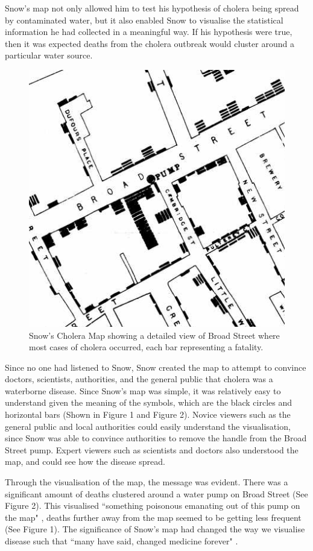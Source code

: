 \documentclass[12pt]{article}
\begin{document}
Snow's map not only allowed him to test his hypothesis of cholera being spread by contaminated water, but it also enabled Snow to visualise the statistical information he had collected in a meaningful way. If his hypothesis were true, then it was expected deaths from the cholera outbreak would cluster around a particular water source. 

\begin{figure}
\centering
\includegraphics[scale=0.8]{snow_map_detail}
\caption{Snow's Cholera Map showing a detailed view of Broad Street where most cases of cholera occurred, each bar representing a fatality. }
\label{fig:snow}
\end{figure}

Since no one had listened to Snow, Snow created the map to attempt to convince doctors, scientists, authorities, and the general public that cholera was a waterborne disease. Since Snow's map was simple, it was relatively easy to understand given the meaning of the symbols, which are the black circles and horizontal bars (Shown in Figure 1 and Figure 2). Novice viewers such as the general public and local authorities could easily understand the visualisation, since Snow was able to convince authorities to remove the handle from the Broad Street pump. Expert viewers such as scientists and doctors also understood the map, and could see how the disease spread. 

Through the visualisation of the map, the message was evident. There was a significant amount of deaths clustered around a water pump on Broad Street (See Figure 2). This visualised ``something poisonous emanating out of this pump on the map" \cite{blog}, deaths further away from the map seemed to be getting less frequent (See Figure 1). The significance of Snow's map had changed the way we visualise disease such that ``many have said, changed medicine forever" \cite{heros}.
\end{document}
